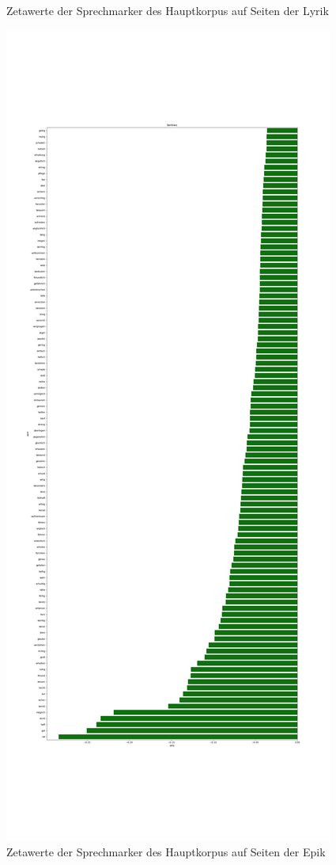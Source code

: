 \documentclass[a4paper,10p]{article}
\begin{document}
\begin{figure}{}
\begin{minipage}[b]{.45\linewidth}
        \caption{Zetawerte der Sprechmarker des Hauptkorpus auf Seiten der Lyrik}
        \label{haupt_sprechmarker}
    \end{minipage}
    \hfill
    \begin{minipage}[b]{.45\linewidth}
        \centering
        \includegraphics[width=\linewidth]{haupt_sentiws_pro_wort2.png}
        \caption{Zetawerte der Sprechmarker des Hauptkorpus auf Seiten der Epik}  
        \label{haupt_sprechmarker2}
    \end{minipage}
\end{figure}
\end{document}
